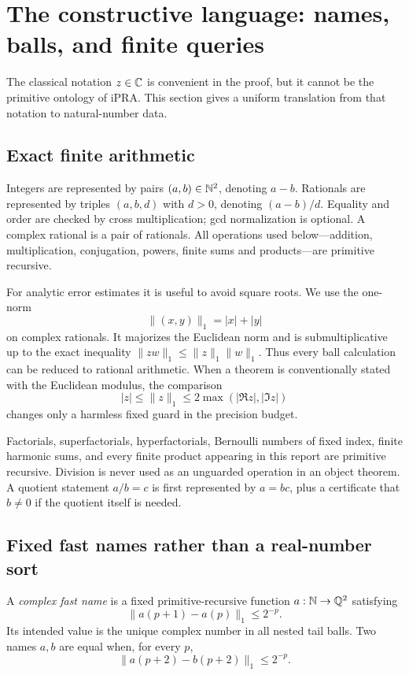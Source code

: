 \section{The constructive language: names, balls, and finite queries}\label{sec:ipra}

The classical notation \(z\in\mathbb C\) is convenient in the proof, but it cannot be
the primitive ontology of iPRA.  This section gives a uniform translation from
that notation to natural-number data.

\subsection{Exact finite arithmetic}

Integers are represented by pairs \((a,b)\in\mathbb N^2\), denoting \(a-b\).
Rationals are represented by triples \((a,b,d)\) with \(d>0\), denoting
\((a-b)/d\).  Equality and order are checked by cross multiplication; gcd
normalization is optional.  A complex rational is a pair of rationals.  All
operations used below---addition, multiplication, conjugation, powers, finite
sums and products---are primitive recursive.

For analytic error estimates it is useful to avoid square roots.  We use the
one-norm
\[
 \|(x,y)\|_1=|x|+|y|
\]
on complex rationals.  It majorizes the Euclidean norm and is submultiplicative
up to the exact inequality
\(\|zw\|_1\le \|z\|_1\|w\|_1\).  Thus every ball calculation can be reduced to
rational arithmetic.  When a theorem is conventionally stated with the
Euclidean modulus, the comparison
\[
 |z|\le \|z\|_1\le 2\max(|\Re z|,|\Im z|)
\]
changes only a harmless fixed guard in the precision budget.

Factorials, superfactorials, hyperfactorials, Bernoulli numbers of fixed index,
finite harmonic sums, and every finite product appearing in this report are
primitive recursive.  Division is never used as an unguarded operation in an
object theorem.  A quotient statement \(a/b=c\) is first represented by
\(a=bc\), plus a certificate that \(b\ne0\) if the quotient itself is needed.

\subsection{Fixed fast names rather than a real-number sort}

\begin{definition}
A \emph{complex fast name} is a fixed primitive-recursive function
\(a:\mathbb N\to\mathbb Q^2\) satisfying
\[
 \|a(p+1)-a(p)\|_1\le 2^{-p}.
\]
Its intended value is the unique complex number in all nested tail balls.
Two names \(a,b\) are equal when, for every \(p\),
\[
 \|a(p+2)-b(p+2)\|_1\le 2^{-p}.
\]
\end{definition}

